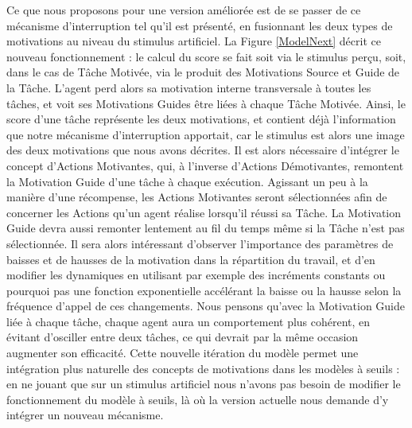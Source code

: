 	Ce que nous proposons pour une version améliorée est de se passer de ce mécanisme d'interruption tel qu'il est présenté, en fusionnant les deux types de motivations au niveau du stimulus artificiel. La Figure \ref{ModelNext} décrit ce nouveau fonctionnement : le calcul du score se fait soit via le stimulus perçu, soit, dans le cas de Tâche Motivée, via le produit des Motivations Source et Guide de la Tâche. L'agent perd alors sa motivation interne transversale à toutes les tâches, et voit ses Motivations Guides être liées à chaque Tâche Motivée. Ainsi, le score d'une tâche représente les deux motivations, et contient déjà l'information que notre mécanisme d'interruption apportait, car le stimulus est alors une image des deux motivations que nous avons décrites. Il est alors nécessaire d'intégrer le concept d'Actions Motivantes, qui, à l'inverse d'Actions Démotivantes, remontent la Motivation Guide d'une tâche à chaque exécution. Agissant un peu à la manière d'une récompense, les Actions Motivantes seront sélectionnées afin de concerner les Actions qu'un agent réalise lorsqu'il réussi sa Tâche. La Motivation Guide devra aussi remonter lentement au fil du temps même si la Tâche n'est pas sélectionnée. Il sera alors intéressant d'observer l'importance des paramètres de baisses et de hausses de la motivation dans la répartition du travail, et d'en modifier les dynamiques en utilisant par exemple des incréments constants ou pourquoi pas une fonction exponentielle accélérant la baisse ou la hausse selon la fréquence d'appel de ces changements. Nous pensons qu'avec la Motivation Guide liée à chaque tâche, chaque agent aura un comportement plus cohérent, en évitant d'osciller entre deux tâches, ce qui devrait par la même occasion augmenter son efficacité. Cette nouvelle itération du modèle permet une intégration plus naturelle des concepts de motivations dans les modèles à seuils : en ne jouant que sur un stimulus artificiel nous n'avons pas besoin de modifier le fonctionnement du modèle à seuils, là où la version actuelle nous demande d'y intégrer un nouveau mécanisme.
	
